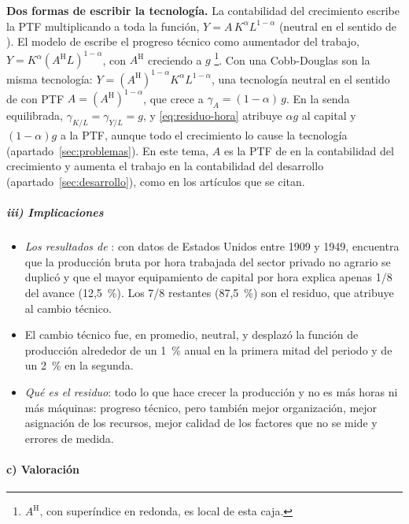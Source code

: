 \documentclass[11pt]{article}
\begin{document}
\begin{anotaciones}
\textbf{Dos formas de escribir la tecnología.} La contabilidad del crecimiento escribe la PTF multiplicando a toda la función, $Y=A\,K^{\alpha}L^{1-\alpha}$ (neutral en el sentido de ). El modelo de  escribe el progreso técnico como aumentador del trabajo, $Y=K^{\alpha}(A^{\mathrm{H}}L)^{1-\alpha}$, con $A^{\mathrm{H}}$ creciendo a $g$ \footnote{$A^{\mathrm{H}}$, con superíndice en redonda, es local de esta caja.}. Con una Cobb-Douglas son la misma tecnología: $Y=(A^{\mathrm{H}})^{1-\alpha}K^{\alpha}L^{1-\alpha}$, una tecnología neutral en el sentido de  con PTF $A=(A^{\mathrm{H}})^{1-\alpha}$, que crece a $\gamma_A=(1-\alpha)\,g$. En la senda equilibrada, $\gamma_{K/L}=\gamma_{Y/L}=g$, y \eqref{eq:residuo-hora} atribuye $\alpha g$ al capital y $(1-\alpha)g$ a la PTF, aunque todo el crecimiento lo cause la tecnología (apartado~\ref{sec:problemas}). En este tema, $A$ es la PTF de  en la contabilidad del crecimiento y aumenta el trabajo en la contabilidad del desarrollo (apartado~\ref{sec:desarrollo}), como en los artículos que se citan.
\end{anotaciones}

\subparagraph{iii) Implicaciones}

\begin{itemize}
\item \emph{Los resultados de }: con datos de Estados Unidos entre 1909 y 1949, \textcite[pp.~316 y 320]{Solow1957} encuentra que la producción bruta por hora trabajada del sector privado no agrario se duplicó y que el mayor equipamiento de capital por hora explica apenas 1/8 del avance (12,5~\%). Los 7/8 restantes (87,5~\%) son el residuo, que atribuye al cambio técnico.
\item El cambio técnico fue, en promedio, neutral, y desplazó la función de producción alrededor de un 1~\% anual en la primera mitad del periodo y de un 2~\% en la segunda\nocite{Solow1957}.
\item \emph{Qué es el residuo}: todo lo que hace crecer la producción y no es más horas ni más máquinas: progreso técnico, pero también mejor organización, mejor asignación de los recursos, mejor calidad de los factores que no se mide y errores de medida.
\end{itemize}

\paragraph{c) Valoración}
\end{document}
